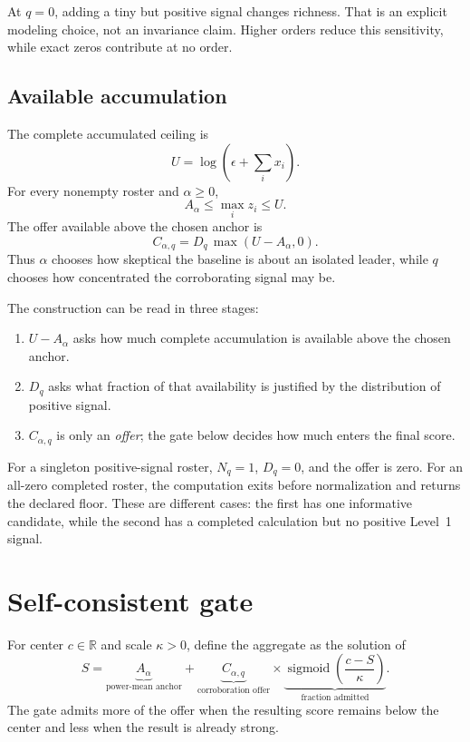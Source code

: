 \documentclass[11pt]{article}
\newcommand{\sigmoid}{\operatorname{sigmoid}}
\begin{document}
At $q=0$, adding a tiny but positive signal changes richness. That is an
explicit modeling choice, not an invariance claim. Higher orders reduce this
sensitivity, while exact zeros contribute at no order.

\subsection{Available accumulation}

The complete accumulated ceiling is
\begin{equation}
U=\log\left(\epsilon+\sum_i x_i\right).
\label{eq:ceiling}
\end{equation}
For every nonempty roster and $\alpha\geq0$,
\[
A_\alpha\leq \max_i z_i\leq U.
\]
The offer available above the chosen anchor is
\begin{equation}
C_{\alpha,q}
=D_q\,\max(U-A_\alpha,0).
\label{eq:offer}
\end{equation}
Thus $\alpha$ chooses how skeptical the baseline is about an isolated leader,
while $q$ chooses how concentrated the corroborating signal may be.

The construction can be read in three stages:
\begin{enumerate}
  \item $U-A_\alpha$ asks how much complete accumulation is available above
  the chosen anchor.
  \item $D_q$ asks what fraction of that availability is justified by the
  distribution of positive signal.
  \item $C_{\alpha,q}$ is only an \emph{offer}; the gate below decides how
  much enters the final score.
\end{enumerate}

For a singleton positive-signal roster, $N_q=1$, $D_q=0$, and the offer is
zero. For an all-zero completed roster, the computation exits before
normalization and returns the declared floor. These are different cases:
the first has one informative candidate, while the second has a completed
calculation but no positive Level~1 signal.

\section{Self-consistent gate}

For center $c\in\mathbb R$ and scale $\kappa>0$, define the aggregate as the
solution of
\begin{equation}
\boxed{
S
=
\underbrace{A_\alpha}_{\text{power-mean anchor}}
+
\underbrace{C_{\alpha,q}}_{\text{corroboration offer}}\times
\underbrace{\sigmoid\left(\frac{c-S}{\kappa}\right)}_
{\text{fraction admitted}}
}.
\label{eq:self-gate}
\end{equation}
The gate admits more of the offer when the resulting score remains below the
center and less when the result is already strong.
\end{document}
